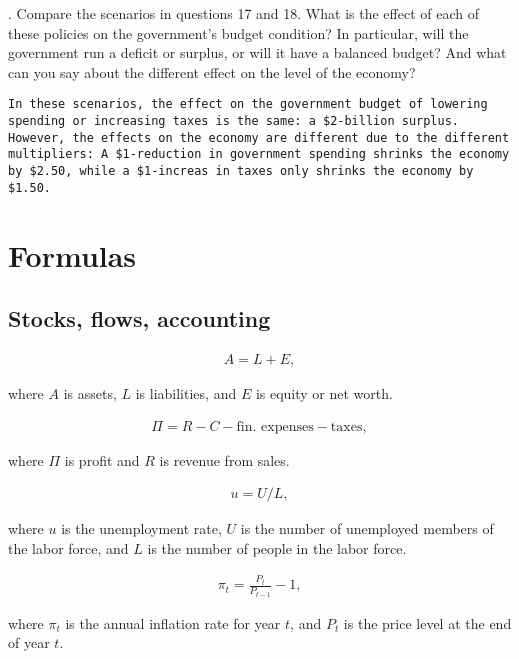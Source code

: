 \documentclass[12pt]{article}
\begin{document}
\vspace{12pt}

. Compare the scenarios in questions 17 and 18.  What is the effect of each of these policies on the government's budget condition?  In particular, will the government run a deficit or surplus, or will it have a balanced budget?  And what can you say about the different effect on the level of the economy?

\vspace{10pt}

\texttt{In these scenarios, the effect on the government budget of lowering spending or increasing taxes is the same: a \$2-billion surplus.  However, the effects on the economy are different due to the different multipliers: A \$1-reduction in government spending shrinks the economy by \$2.50, while a \$1-increas in taxes only shrinks the economy by \$1.50.}

\section*{Formulas}

\subsection*{Stocks, flows, accounting}

\begin{eqnarray} A = L + E, \end{eqnarray}

\noindent where $A$ is assets, $L$ is liabilities, and $E$ is equity or net worth.

\begin{eqnarray} \Pi = R - C - \textrm{fin. expenses} - \textrm{taxes}, \end{eqnarray}

\noindent where $\Pi$ is profit and $R$ is revenue from sales.

\begin{eqnarray} u = U/L, \end{eqnarray}

\noindent where $u$ is the unemployment rate, $U$ is the number of unemployed members of the labor force, and $L$ is the number of people in the labor force.

\begin{eqnarray} \pi_t = \frac{P_t}{P_{t-1}} - 1,\end{eqnarray}

\noindent where $\pi_t$ is the annual inflation rate for year $t$, and $P_t$ is the price level at the end of year $t$.
\end{document}
